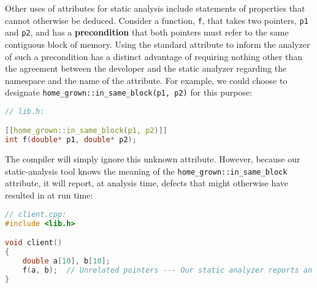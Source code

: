 Other uses of attributes for static analysis include statements of
properties that cannot otherwise be deduced. Consider a function, \texttt{f}, that takes two pointers,
\texttt{p1} and \texttt{p2}, and has a \textbf{precondition} that both
pointers must refer to the same contiguous block of memory. Using the standard attribute to inform the analyzer of such a precondition has a distinct advantage of requiring nothing other than the agreement between the developer and the static analyzer regarding the namespace and the name of the attribute. For example, we could choose to designate \lstinline!home_grown::in_same_block(p1, p2)! for this purpose:

\begin{lstlisting}[language=C++]
// lib.h:

[[home_grown::in_same_block(p1, p2)]]
int f(double* p1, double* p2);
\end{lstlisting}

\noindent The compiler will simply ignore this unknown attribute. However, because our static-analysis tool knows the meaning of the \lstinline!home_grown::in_same_block! attribute, it will report, at analysis time, defects that might otherwise have resulted in  at run time:

\begin{lstlisting}[language=C++]
// client.cpp:
#include <lib.h>

void client()
{
    double a[10], b[10];
    f(a, b);  // Unrelated pointers --- Our static analyzer reports an error.
}
\end{lstlisting}



